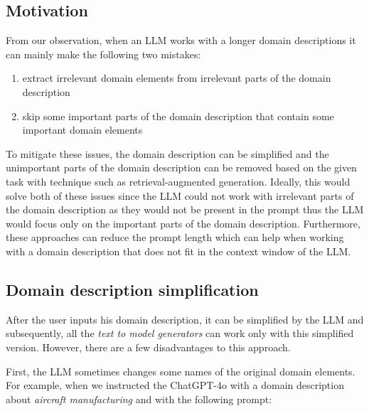 \subsection{Motivation}

From our observation, when an LLM works with a longer domain descriptions it can mainly make the following two mistakes:

\begin{enumerate}
\item extract irrelevant domain elements from irrelevant parts of the domain description
\item skip some important parts of the domain description that contain some important domain elements
\end{enumerate}


To mitigate these issues, the domain description can be simplified and the unimportant parts of the domain description can be removed based on the given task with technique such as retrieval-augmented generation. Ideally, this would solve both of these issues since the LLM could not work with irrelevant parts of the domain description as they would not be present in the prompt thus the LLM would focus only on the important parts of the domain description.
Furthermore, these approaches can reduce the prompt length which can help when working with a domain description that does not fit in the context window of the LLM.



\subsection{Domain description simplification}

After the user inputs his domain description, it can be simplified by the LLM and subsequently, all the \emph{text to model generators} can work only with this simplified version. However, there are a few disadvantages to this approach.

First, the LLM sometimes changes some names of the original domain elements. For example, when we instructed the ChatGPT-4o with a domain description about \emph{aircraft manufacturing} and with the following prompt: \\


